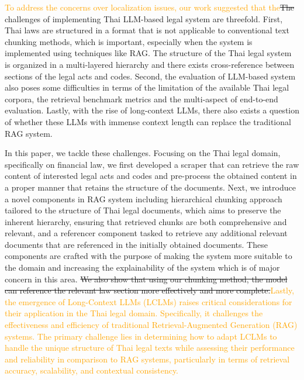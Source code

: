 \textcolor{orange}{To address the concerns over localization issues, our work suggested that the}\st{The} challenges of implementing Thai LLM-based legal system are threefold. 
First, Thai laws are structured in a format that is not applicable to conventional text chunking methods, which is important, especially when the system is implemented using techniques like RAG.
%
The structure of the Thai legal system is organized in a multi-layered hierarchy and there exists cross-reference between sections of the legal acts and codes.
Second, the evaluation of LLM-based system also poses some difficulties in terms of the limitation of the available Thai legal corpora, the retrieval benchmark metrics and the multi-aspect of end-to-end evaluation.
Lastly, with the rise of long-context LLMs, there also exists a question of whether these LLMs with immense context length can replace the traditional RAG system.

In this paper, we tackle these challenges. 
Focusing on the Thai legal domain, specifically on financial law, we first developed a scraper that can retrieve the raw content of interested legal acts and codes and pre-process the obtained content in a proper manner that retains the structure of the documents. 
Next, we introduce a novel components in RAG system including hierarchical chunking approach tailored to the structure of Thai legal documents, which aims to preserve the inherent hierarchy, ensuring that retrieved chunks are both comprehensive and relevant, and a referencer component tasked to retrieve any additional relevant documents that are referenced in the initially obtained documents. 
These components are crafted with the purpose of making the system more suitable to the domain and increasing the explainability of the system which is of major concern in this area. \st{We also show that using our chunking method, the model can reference the relevant law section more effectively and more complete.}\textcolor{orange}{Lastly, the emergence of Long-Context LLMs (LCLMs) raises critical considerations for their application in the Thai legal domain. Specifically, it challenges the effectiveness and efficiency of traditional Retrieval-Augmented Generation (RAG) systems. The primary challenge lies in determining how to adapt LCLMs to handle the unique structure of Thai legal texts while assessing their performance and reliability in comparison to RAG systems, particularly in terms of retrieval accuracy, scalability, and contextual consistency.}


